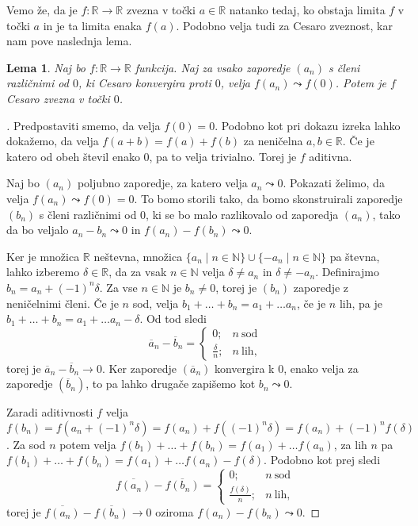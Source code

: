 \documentclass[a4paper,12pt]{article}
\def\N{\mathbb{N}}
\def\R{\mathbb{R}}
\theoremstyle{definition}
\theoremstyle{plain}
\newtheorem{lema}{Lema}
\newenvironment{dokaz}{\begin{proof}[\bfseries\upshape\proofname]}{\end{proof}}
\begin{document}
Vemo že, da je $f: \mathbb{R} \rightarrow \mathbb{R}$ zvezna v točki $a \in \mathbb{R}$ natanko tedaj, ko obstaja limita $f$ v točki $a$ in je ta limita enaka $f(a)$. Podobno velja tudi za Cesaro zveznost, kar nam pove naslednja lema.
\begin{lema}
    Naj bo $f: \mathbb{R} \rightarrow \mathbb{R}$ funkcija. Naj za vsako zaporedje $(a_n)$ s členi različnimi od $0$, ki Cesaro konvergira proti $0$, velja $f(a_n) \leadsto f(0)$. Potem je $f$ Cesaro zvezna v točki $0$.
\end{lema}
\begin{dokaz}
    Predpostaviti smemo, da velja $f(0) = 0$. Podobno kot pri dokazu izreka lahko dokažemo, da velja $f(a+b) = f(a) + f(b)$ za neničelna $a, b \in \mathbb{R}$. Če je katero od obeh števil enako $0$, pa to velja trivialno. Torej je $f$ aditivna. 
    
    Naj bo $(a_n)$ poljubno zaporedje, za katero velja $a_n \leadsto 0$. Pokazati želimo, da velja $f(a_n) \leadsto f(0) = 0$. To bomo storili tako, da bomo skonstruirali zaporedje $(b_n)$ s členi različnimi od $0$, ki se bo malo razlikovalo od zaporedja $(a_n)$, tako da bo veljalo $a_n - b_n \leadsto 0$ in $f(a_n) - f(b_n) \leadsto 0$.

    Ker je množica $\R$ neštevna, množica $\{a_n \mid n \in \N\} \cup \{-a_n \mid n \in \N\}$ pa števna, lahko izberemo $\delta \in \R$, da za vsak $n \in \N$ velja $\delta \neq a_n$ in $\delta \neq -a_n$. Definirajmo $b_n = a_n + (-1)^n \delta$. Za vse $n \in \N$ je $b_n \neq 0$, torej je $(b_n)$ zaporedje z neničelnimi členi. Če je $n$ sod, velja $b_1 + \ldots + b_n = a_1 + \ldots a_n$, če je $n$ lih, pa je $b_1 + \ldots + b_n = a_1 + \ldots a_n - \delta$. Od tod sledi
    $$
    \overline{a}_n - \overline{b}_n = \begin{cases}
        0; & n \ \text{sod}\\
        \frac{\delta}{n}; & n \ \text{lih},
    \end{cases}
    $$
    torej je $\overline{a}_n - \overline{b}_n \rightarrow 0$. Ker zaporedje $(\overline{a}_n)$ konvergira k 0, enako velja za zaporedje $(\overline{b}_n)$, to pa lahko drugače zapišemo kot $b_n \leadsto 0$.

    Zaradi aditivnosti $f$ velja $f(b_n) = f(a_n + (-1)^n \delta) = f(a_n) + f((-1)^n \delta) = f(a_n) + (-1)^n f(\delta)$. Za sod $n$ potem velja $f(b_1) + \ldots + f(b_n) = f(a_1) + \ldots f(a_n)$, za lih $n$ pa $f(b_1) + \ldots + f(b_n) = f(a_1) + \ldots f(a_n) - f(\delta)$. Podobno kot prej sledi
    $$
    \overline{f(a_n)} - \overline{f(b_n)} = \begin{cases}
        0; & n \ \text{sod}\\
        \frac{f(\delta)}{n}; & n \ \text{lih},
    \end{cases}
    $$
    torej je $\overline{f(a_n)} - \overline{f(b_n)} \rightarrow 0$ oziroma $f(a_n) - f(b_n) \leadsto 0$.


\end{dokaz}
\end{document}
